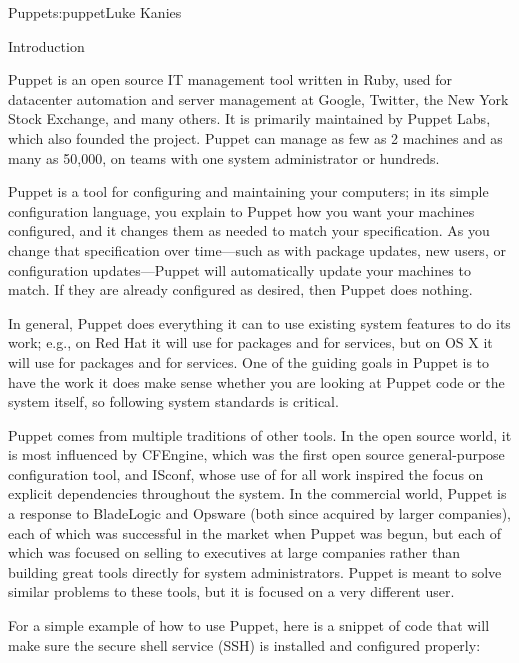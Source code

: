 \begin{aosachapter}{Puppet}{s:puppet}{Luke Kanies}


\begin{aosasect1}{Introduction}

Puppet is an open source IT management tool written in Ruby, used for
datacenter automation and server management at Google, Twitter, the
New York Stock Exchange, and many others. It is primarily maintained
by Puppet Labs, which also founded the project.  Puppet can manage as
few as 2 machines and as many as 50,000, on teams with one system
administrator or hundreds.

Puppet is a tool for configuring and maintaining your computers; in
its simple configuration language, you explain to Puppet how you want
your machines configured, and it changes them as needed to match your
specification.  As you change that specification over time---such as
with package updates, new users, or configuration updates---Puppet
will automatically update your machines to match.  If they are already
configured as desired, then Puppet does nothing.

In general, Puppet does everything it can to use existing system
features to do its work; e.g., on Red Hat it will use  for packages and
 for services, but on OS X it will use  for packages and
 for services.  One of the guiding goals in Puppet is to have
the work it does make sense whether you are looking at Puppet code or
the system itself, so following system standards is critical.

Puppet comes from multiple traditions of other tools.  In the open
source world, it is most influenced by CFEngine, which was the first
open source general-purpose configuration tool, and ISconf, whose use
of  for all work inspired the focus on explicit dependencies
throughout the system.  In the commercial world, Puppet is a response
to BladeLogic and Opsware (both since acquired by larger companies),
each of which was successful in the market when Puppet was begun, but
each of which was focused on selling to executives at large companies
rather than building great tools directly for system administrators.
Puppet is meant to solve similar problems to these tools, but it is
focused on a very different user.

For a simple example of how to use Puppet, here is a snippet of code
that will make sure the secure shell service (SSH) is installed and
configured properly:


\end{aosasect1}
\end{aosachapter}
